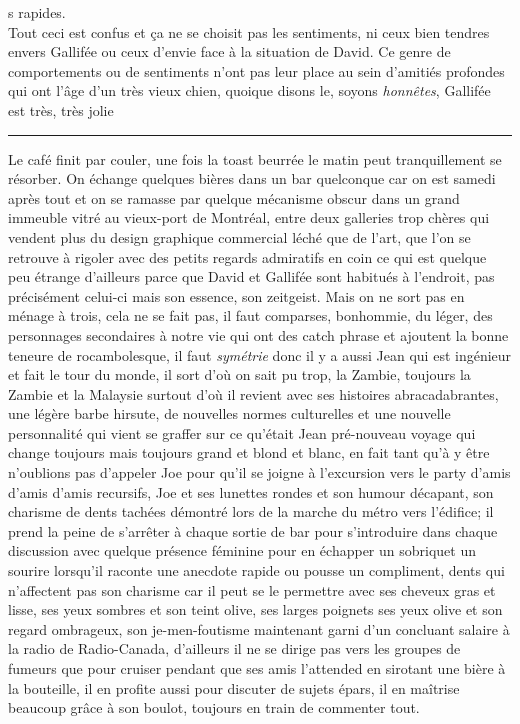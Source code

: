 \documentclass{article}
\begin{document}
s rapides. \\

Tout ceci est confus et ça ne se choisit pas les sentiments, ni ceux bien
tendres envers Gallifée ou ceux d'envie face à la situation de David. Ce
genre de comportements ou de sentiments n'ont pas leur place au sein
d'amitiés profondes qui ont l'âge d'un très vieux chien, quoique disons le,
soyons \emph{honnêtes}, Gallifée est très, très jolie\\


\begin{center}\noindent\rule{0.5\textwidth}{0.4pt}\end{center}


Le café finit par couler, une fois la toast beurrée le matin peut tranquillement
se résorber. On échange quelques bières dans un bar quelconque car on est samedi
après tout et on se ramasse par quelque mécanisme obscur dans un grand immeuble
vitré au vieux-port de Montréal, entre deux galleries trop chères qui vendent
plus du design graphique commercial léché que de l'art, que l'on se retrouve à
rigoler avec des petits regards admiratifs en coin ce qui est quelque peu
étrange d'ailleurs parce que David et Gallifée sont habitués à l'endroit, pas
précisément celui-ci mais son essence, son zeitgeist. Mais on ne sort pas en
ménage à trois, cela ne se fait pas, il faut comparses, bonhommie, du léger, des
personnages secondaires à notre vie qui ont des catch phrase et ajoutent la
bonne teneure de rocambolesque, il faut \emph{symétrie} donc il y a aussi Jean
qui est ingénieur et fait le tour du monde, il sort d'où on sait pu trop, la
Zambie, toujours la Zambie et la Malaysie surtout d'où il revient avec ses
histoires abracadabrantes, une légère barbe hirsute, de nouvelles normes
culturelles et une nouvelle personnalité qui vient se graffer sur ce qu'était
Jean pré-nouveau voyage qui change toujours mais toujours grand et blond et
blanc, en fait tant qu'à y être n'oublions pas d'appeler Joe pour qu'il se
joigne à l'excursion vers le party d'amis d'amis d'amis recursifs, Joe et ses
lunettes rondes et son humour décapant, son charisme de dents tachées démontré
lors de la marche du métro vers l'édifice; il prend la peine de s'arrêter à
chaque sortie de bar pour s'introduire dans chaque discussion avec quelque
présence féminine pour en échapper un sobriquet un sourire lorsqu'il raconte une
anecdote rapide ou pousse un compliment, dents qui n'affectent pas son charisme
car il peut se le permettre avec ses cheveux gras et lisse, ses yeux sombres et
son teint olive, ses larges poignets ses yeux olive et son regard ombrageux, son
je-men-foutisme maintenant garni d'un concluant salaire à la radio de
Radio-Canada, d'ailleurs il ne se dirige pas vers les groupes de fumeurs que
pour cruiser pendant que ses amis l'attended en sirotant une bière à la
bouteille, il en profite aussi pour discuter de sujets épars, il en maîtrise
beaucoup grâce à son boulot, toujours en train de commenter tout.\\
\end{document}

